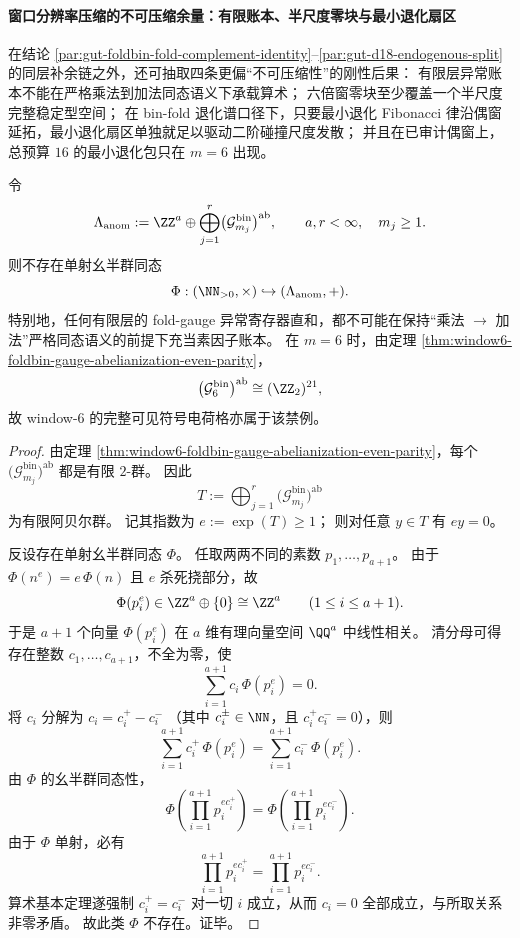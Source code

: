 \paragraph{窗口分辨率压缩的不可压缩余量：有限账本、半尺度零块与最小退化扇区}\label{par:gut-resolution-ledger-collision-obstruction}
在结论 \ref{par:gut-foldbin-fold-complement-identity}--\ref{par:gut-d18-endogenous-split} 的同层补余链之外，还可抽取四条更偏“不可压缩性”的刚性后果：
有限层异常账本不能在严格乘法到加法同态语义下承载算术；
六倍窗零块至少覆盖一个半尺度完整稳定型空间；
在 bin-fold 退化谱口径下，只要最小退化 Fibonacci 律沿偶窗延拓，最小退化扇区单独就足以驱动二阶碰撞尺度发散；
并且在已审计偶窗上，总预算 \(16\) 的最小退化包只在 \(m=6\) 出现。

\begin{theorem}[有限分辨率异常账本不可能同态承载乘法算术]\label{thm:gut-finite-anomaly-ledger-no-multiplicative-embedding}
令
\[
\Lambda_{\mathrm{anom}}
:=\ZZ^a\oplus\bigoplus_{j=1}^r\bigl(\mathcal G^{\mathrm{bin}}_{m_j}\bigr)^{\mathrm{ab}},
\qquad a,r<\infty,\quad m_j\ge 1.
\]
则不存在单射幺半群同态
\[
\Phi:(\NN_{>0},\times)\hookrightarrow (\Lambda_{\mathrm{anom}},+).
\]
特别地，任何有限层的 fold-gauge 异常寄存器直和，都不可能在保持“乘法 \(\to\) 加法”严格同态语义的前提下充当素因子账本。
在 \(m=6\) 时，由定理 \ref{thm:window6-foldbin-gauge-abelianization-even-parity}，
\[
\bigl(\mathcal G^{\mathrm{bin}}_6\bigr)^{\mathrm{ab}}\cong (\ZZ_2)^{21},
\]
故 window-\(6\) 的完整可见符号电荷格亦属于该禁例。
\end{theorem}
\begin{proof}
由定理 \ref{thm:window6-foldbin-gauge-abelianization-even-parity}，每个
\(
\bigl(\mathcal G^{\mathrm{bin}}_{m_j}\bigr)^{\mathrm{ab}}
\)
都是有限 \(2\)-群。
因此
\[
T:=\bigoplus_{j=1}^r\bigl(\mathcal G^{\mathrm{bin}}_{m_j}\bigr)^{\mathrm{ab}}
\]
为有限阿贝尔群。
记其指数为
\(
e:=\exp(T)\ge 1
\)；
则对任意 \(y\in T\) 有 \(ey=0\)。
\par
反设存在单射幺半群同态 \(\Phi\)。
任取两两不同的素数 \(p_1,\dots,p_{a+1}\)。
由于 \(\Phi(n^e)=e\,\Phi(n)\) 且 \(e\) 杀死挠部分，故
\[
\Phi(p_i^e)\in \ZZ^a\oplus\{0\}\cong \ZZ^a
\qquad(1\le i\le a+1).
\]
于是 \(a+1\) 个向量 \(\Phi(p_i^e)\) 在 \(a\) 维有理向量空间 \(\QQ^a\) 中线性相关。
清分母可得存在整数 \(c_1,\dots,c_{a+1}\)，不全为零，使
\[
\sum_{i=1}^{a+1} c_i\,\Phi(p_i^e)=0.
\]
将 \(c_i\) 分解为
\(
c_i=c_i^+-c_i^-
\)
（其中 \(c_i^\pm\in\NN\)，且 \(c_i^+c_i^-=0\)），则
\[
\sum_{i=1}^{a+1} c_i^+\,\Phi(p_i^e)
=
\sum_{i=1}^{a+1} c_i^-\,\Phi(p_i^e).
\]
由 \(\Phi\) 的幺半群同态性，
\[
\Phi\!\left(\prod_{i=1}^{a+1} p_i^{e c_i^+}\right)
=
\Phi\!\left(\prod_{i=1}^{a+1} p_i^{e c_i^-}\right).
\]
由于 \(\Phi\) 单射，必有
\[
\prod_{i=1}^{a+1} p_i^{e c_i^+}
=
\prod_{i=1}^{a+1} p_i^{e c_i^-}.
\]
算术基本定理遂强制 \(c_i^+=c_i^-\) 对一切 \(i\) 成立，从而 \(c_i=0\) 全部成立，与所取关系非零矛盾。
故此类 \(\Phi\) 不存在。证毕。
\end{proof}

